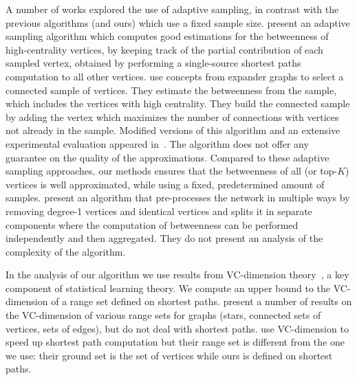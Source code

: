 A number of works explored
the use of adaptive sampling, in contrast with the previous algorithms (and
ours) which use a fixed sample size. \citet{BaderKMM07} present an adaptive
sampling algorithm which computes good estimations for the betweenness of
high-centrality vertices, by keeping track of the partial contribution of each
sampled vertex, obtained by performing a single-source shortest paths
computation to all other vertices. \citet{MaiyaBW10} use concepts from expander
graphs to select a connected sample of vertices. They estimate the betweenness
from the sample, which includes the vertices with high centrality. They build
the connected sample by adding the vertex which maximizes the number of
connections with vertices not already in the sample. Modified versions
of this algorithm and an extensive experimental evaluation appeared
in~\citep{LimMRTB11}. The algorithm does not offer any guarantee on the quality
of the approximations. Compared to these adaptive sampling approaches, our
methods ensures that the betweenness of all (or top-$K$) vertices is well
approximated, while using a fixed, predetermined amount of samples.
\citep{SaryuceSKC13} present an algorithm that pre-processes the network in
multiple ways by removing degree-1 vertices and identical vertices and splits it
in separate components where the computation of betweenness can be performed
independently and then aggregated. They do not present an analysis of the
complexity of the algorithm. 

In the analysis of our algorithm we use results from VC-dimension
theory~\citep{VapnikC71}, a key component of statistical learning theory. We
compute an upper bound to the VC-dimension of a range set defined on shortest
paths. \citet{KranakisKRUW97} present a number of results on the VC-dimension of
various range sets for graphs (stars, connected sets of vertices, sets of
edges), but do not deal with shortest paths. \citet{AbrahamDFGW11} use
VC-dimension to speed up shortest path computation but their range set is
different from the one we use: their ground set is the set of vertices while
ours is defined on shortest paths.

